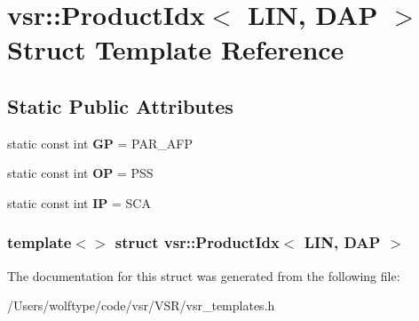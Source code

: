 \hypertarget{structvsr_1_1_product_idx_3_01_l_i_n_00_01_d_a_p_01_4}{\section{vsr\-:\-:Product\-Idx$<$ L\-I\-N, D\-A\-P $>$ Struct Template Reference}
\label{structvsr_1_1_product_idx_3_01_l_i_n_00_01_d_a_p_01_4}
}
\subsection*{Static Public Attributes}
\begin{DoxyCompactItemize}
\item 
\hypertarget{structvsr_1_1_product_idx_3_01_l_i_n_00_01_d_a_p_01_4_a1a163422601eccf6e0b6f7be62bb38ae}{static const int {\bfseries G\-P} = P\-A\-R\-\_\-\-A\-F\-P}\label{structvsr_1_1_product_idx_3_01_l_i_n_00_01_d_a_p_01_4_a1a163422601eccf6e0b6f7be62bb38ae}

\item 
\hypertarget{structvsr_1_1_product_idx_3_01_l_i_n_00_01_d_a_p_01_4_a29e7a2a830333332741f364b2379bde8}{static const int {\bfseries O\-P} = P\-S\-S}\label{structvsr_1_1_product_idx_3_01_l_i_n_00_01_d_a_p_01_4_a29e7a2a830333332741f364b2379bde8}

\item 
\hypertarget{structvsr_1_1_product_idx_3_01_l_i_n_00_01_d_a_p_01_4_a5da95ba5e18e9fe923ef7d38d4c82576}{static const int {\bfseries I\-P} = S\-C\-A}\label{structvsr_1_1_product_idx_3_01_l_i_n_00_01_d_a_p_01_4_a5da95ba5e18e9fe923ef7d38d4c82576}

\end{DoxyCompactItemize}
\subsubsection*{template$<$$>$ struct vsr\-::\-Product\-Idx$<$ L\-I\-N, D\-A\-P $>$}



The documentation for this struct was generated from the following file\-:\begin{DoxyCompactItemize}
\item 
/\-Users/wolftype/code/vsr/\-V\-S\-R/vsr\-\_\-templates.\-h\end{DoxyCompactItemize}
